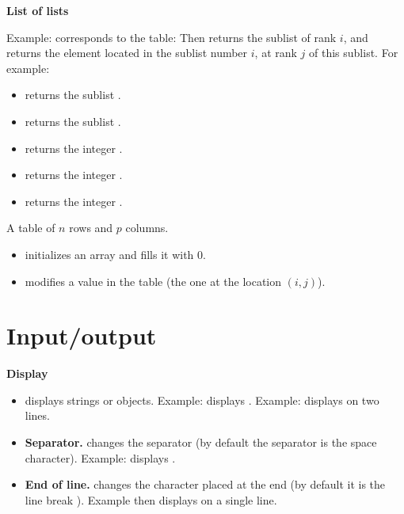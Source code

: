\documentclass[11pt,class=report,crop=false]{standalone}
\begin{document}
\bigskip	 

\textbf{List of lists}
  
Example: 
  corresponds to the table:
  Then  returns the sublist of rank $i$, and
   returns the element located in the sublist number $i$, at rank $j$  of this sublist. For example:
  \begin{itemize}
  \item {} \quad returns the sublist \ci{[2,14,5]}.
  \item {} \quad returns the sublist \ci{[3,5,7]}.
  \item {} \quad returns the integer .
  \item {} \quad returns the integer .
  \item {} \quad returns the integer .
\end{itemize}

\medskip

A table of $n$ rows and $p$ columns.
\begin{itemize}
    \item {} \quad initializes an array and fills it with $0$.
    \item {} \quad modifies a value in the table (the one at the location $(i,j)$).
\end{itemize}


\section{Input/output}

\textbf{Display}

\begin{itemize}
  \item {} \quad displays strings or objects.
 Example:  displays .
 Example:  displays on two lines.
 
  \item \textbf{Separator.}  \quad changes the separator (by default the separator is the space character). Example:  displays
  .
  
   \item \textbf{End of line.}  \quad changes the character placed at the end (by default it is the line break \ci{\\n}).
   Example  then  displays  on a single line.
   
\end{itemize}
\end{document}
